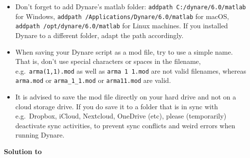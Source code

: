 \begin{itemize}

\item
Don't forget to add Dynare's matlab folder:
\texttt{addpath C:/dynare/6.0/matlab} for Windows,
\texttt{addpath /Applications/Dynare/6.0/matlab} for macOS,
\texttt{addpath /opt/dynare/6.0/matlab} for Linux machines.
If you installed Dynare to a different folder, adapt the path accordingly.

\item
When saving your Dynare script as a mod file, try to use a simple name.
That is, don't use special characters or spaces in the filename, e.g.\
  \texttt{arma{(1,1)}.mod} as well as \texttt{arma 1 1.mod} are not valid filenames,
  whereas \texttt{arma.mod} or \texttt{arma\_1\_1.mod} or \texttt{arma11.mod} are valid.

\item
It is advised to save the mod file directly on your hard drive and not on a cloud storage drive.
If you do save it to a folder that is in sync with e.g.\ Dropbox, iCloud, Nextcloud, OneDrive (etc),
  please (temporarily) deactivate sync activities,
  to prevent sync conflicts and weird errors when running Dynare.

\end{itemize}


\begin{solution}\textbf{Solution to }
\ifDisplaySolutions%

\fi
\newpage
\end{solution}